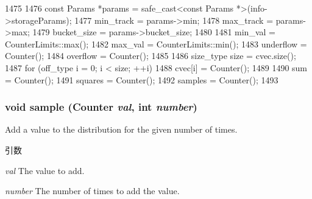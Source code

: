 \begin{DoxyCode}
1475     {
1476         const Params *params = safe_cast<const Params *>(info->storageParams);
1477         min_track = params->min;
1478         max_track = params->max;
1479         bucket_size = params->bucket_size;
1480 
1481         min_val = CounterLimits::max();
1482         max_val = CounterLimits::min();
1483         underflow = Counter();
1484         overflow = Counter();
1485 
1486         size_type size = cvec.size();
1487         for (off_type i = 0; i < size; ++i)
1488             cvec[i] = Counter();
1489 
1490         sum = Counter();
1491         squares = Counter();
1492         samples = Counter();
1493     }
\end{DoxyCode}
\hypertarget{classStats_1_1DistStor_a57fea70de4ed8fee9ec9e9d9cca6f9fa}{
\subsubsection[{sample}]{\setlength{\rightskip}{0pt plus 5cm}void sample ({\bf Counter} {\em val}, \/  int {\em number})}}
\label{classStats_1_1DistStor_a57fea70de4ed8fee9ec9e9d9cca6f9fa}
Add a value to the distribution for the given number of times. 
\begin{DoxyParams}{引数}
\item[{\em val}]The value to add. \item[{\em number}]The number of times to add the value. \end{DoxyParams}




